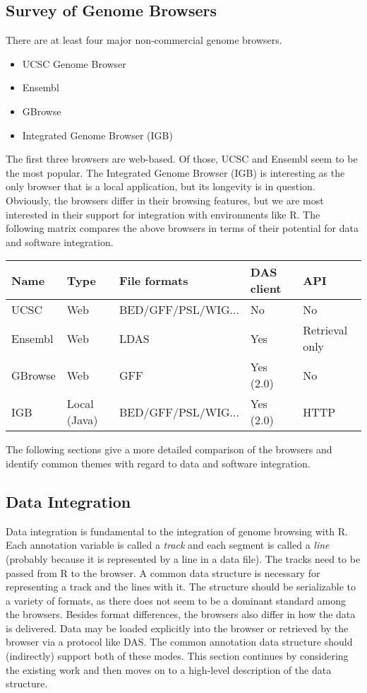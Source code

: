 \documentclass{article}
\begin{document}
\subsection*{Survey of Genome Browsers}
\label{sec:browsers}

There are at least four major non-commercial genome browsers.
\begin{itemize}
\item UCSC Genome Browser
\item Ensembl
\item GBrowse
\item Integrated Genome Browser (IGB)
\end{itemize}
The first three browsers are web-based. Of those, UCSC and Ensembl
seem to be the most popular. The Integrated Genome Browser (IGB) is
interesting as the only browser that is a local application, but its longevity is in question.
Obviously, the browsers differ in their browsing features, but we are
most interested in their support for integration with environments
like R. The following matrix compares the above browsers in terms of
their potential for data and software integration. \\

\begin{tabular}{l|llll} \hline
  Name & Type & File formats & DAS client & API \\ \hline
  UCSC & Web & BED/GFF/PSL/WIG... & No & No \\
  Ensembl & Web & LDAS & Yes & Retrieval only \\
  GBrowse & Web & GFF & Yes (2.0) & No \\
  IGB & Local (Java) & BED/GFF/PSL/WIG... & Yes (2.0) & HTTP \\ \hline
\end{tabular} \newline

The following sections give a more detailed comparison of the browsers
and identify common themes with regard to data and software
integration.

\subsection*{Data Integration}
\label{sec:data}

Data integration is fundamental to the integration of genome browsing
with R. Each annotation variable is called a \emph{track} and each
segment is called a \emph{line} (probably because it is represented by
a line in a data file).  The tracks need to be passed from R to the
browser. A common data structure is necessary for representing
a track and the lines with it. The structure should be serializable to
a variety of formats, as there does not seem to be a dominant standard
among the browsers. Besides format differences, the browsers also
differ in how the data is delivered. Data may be loaded explicitly
into the browser or retrieved by the browser via a protocol like DAS.
The common annotation data structure should (indirectly) support both
of these modes. This section continues by considering the existing
work and then moves on to a high-level description of the data
structure.
\end{document}
